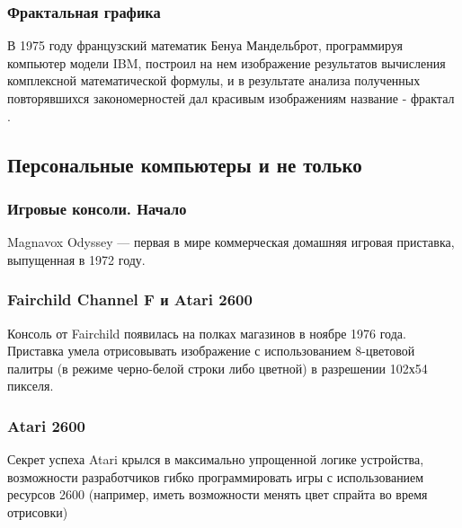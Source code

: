 \documentclass[10pt]{beamer}
\begin{document}
\begin{frame}\frametitle{Фрактальная графика}
{
	{
	}
	{
		В 1975 году французский математик Бенуа Мандельброт, программируя компьютер модели IBM, построил на нем изображение результатов вычисления комплексной математической формулы, и в результате анализа полученных повторявшихся закономерностей дал красивым изображениям название -  {фрактал} .
		
		\hfill 
		
	}
} \end{frame}

\subsection{Персональные компьютеры и не только}
\frame {\subsectionpage}

\begin{frame}\frametitle{Игровые консоли. Начало}{

Magnavox Odyssey — первая в мире коммерческая домашняя игровая приставка, выпущенная в 1972 году.



{
}
{
}


}\end{frame}

\begin{frame}\frametitle{Fairchild Channel F и Atari 2600}{
	
	Консоль от Fairchild появилась на полках магазинов в ноябре 1976 года.  Приставка умела отрисовывать изображение с использованием 8-цветовой палитры (в режиме черно-белой строки либо цветной) в разрешении 102х54 пикселя.	
}\end{frame}

\begin{frame}\frametitle{Atari 2600}{
	{
		\vspace{-1em}
	}
	{
		Секрет успеха Atari крылся в максимально упрощенной логике устройства, возможности разработчиков гибко программировать игры с использованием ресурсов 2600 (например, иметь возможности менять цвет спрайта во время отрисовки)
		
		\hfill
		
		\footnotesize{}
	}
}\end{frame}
\end{document}
